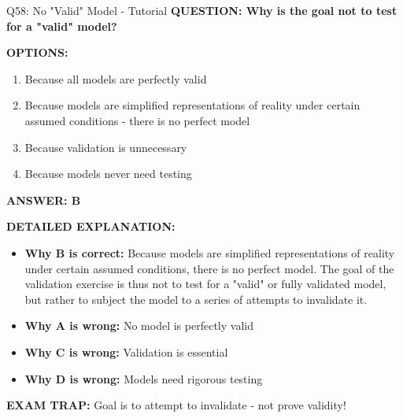 \documentclass[8pt]{beamer}
\begin{document}
	\begin{frame}{Q58: No "Valid" Model - Tutorial}
		\fontsize{6.5}{7.5}\selectfont
		\textbf{QUESTION: Why is the goal not to test for a "valid" model?}
		
		\vspace{0.1cm}
		\textbf{OPTIONS:}
		\begin{enumerate}
			\item Because all models are perfectly valid
			\item Because models are simplified representations of reality under certain assumed conditions - there is no perfect model
			\item Because validation is unnecessary
			\item Because models never need testing
		\end{enumerate}
		
		\vspace{0.1cm}
		\textcolor{myblue}{\textbf{ANSWER: B}}
		
		\vspace{0.1cm}
		\textbf{DETAILED EXPLANATION:}
		\begin{itemize}
			\item \textbf{Why B is correct:} Because models are simplified representations of reality under certain assumed conditions, there is no perfect model. The goal of the validation exercise is thus not to test for a "valid" or fully validated model, but rather to subject the model to a series of attempts to invalidate it.
			\item \textbf{Why A is wrong:} No model is perfectly valid
			\item \textbf{Why C is wrong:} Validation is essential
			\item \textbf{Why D is wrong:} Models need rigorous testing
		\end{itemize}
		
		\textcolor{myred}{\textbf{EXAM TRAP:}} Goal is to \textcolor{myblue}{attempt to invalidate} - not prove validity!
	\end{frame}
	
\end{document}
